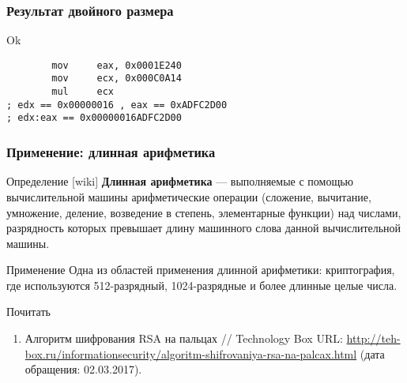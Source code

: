 \documentclass[pdf,9pt,aspectratio=169]{beamer}
\begin{document}
\begin{frame}[fragile]\frametitle{Результат двойного размера}
  \begin{exampleblock}{Ok}
    \begin{center}
    \end{center}
  \end{exampleblock}
  \begin{exampleblock}{}
    \begin{verbatim}
        mov     eax, 0x0001E240
        mov     ecx, 0x000C0A14
        mul     ecx
; edx == 0x00000016 , eax == 0xADFC2D00
; edx:eax == 0x00000016ADFC2D00
    \end{verbatim}
  \end{exampleblock}
\end{frame}

\begin{frame}[fragile]\frametitle{Применение: длинная арифметика}
  \begin{block}{Определение [wiki]}
\textbf{Длинная арифметика} --- выполняемые с помощью вычислительной машины арифметические операции (сложение, вычитание, умножение, деление, возведение в степень, элементарные функции) над числами, разрядность которых превышает длину машинного слова данной вычислительной машины.
  \end{block}

  \begin{block}{Применение}
Одна из областей применения длинной арифметики: криптография, где используются 512-разрядный, 1024-разрядные и более длинные целые числа.
  \end{block}

  \begin{block}{Почитать}
    \begin{enumerate}
      \item Алгоритм шифрования RSA на пальцах // Technology Box URL: \url{http://teh-box.ru/informationsecurity/algoritm-shifrovaniya-rsa-na-palcax.html} (дата обращения: 02.03.2017).
    \end{enumerate}
  \end{block}
\end{frame}
\end{document}
